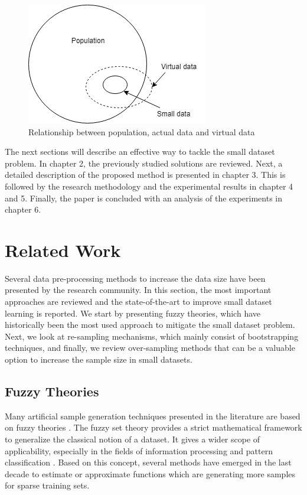 \documentclass[parskip=full]{scrartcl}
\begin{document}
\begin{figure}[H]
	\centering
	\includegraphics[width=0.35\linewidth]{./resources/relationship}
	\caption{Relationship between population, actual data and virtual data \cite{Li.2006}}
	\label{fig:relationship}
\end{figure}

The next sections will describe an effective way to tackle the small dataset 
problem. In chapter 2, the previously studied solutions are reviewed. Next, a 
detailed description of the proposed method is presented in chapter 3. This is 
followed by the research methodology and the experimental results in chapter 4 
and 5. Finally, the paper is concluded with an analysis of the experiments in 
chapter 6.

\section{Related Work}

Several data pre-processing methods to increase the data size have been presented by the research 
community. In this section, the most important approaches are reviewed and the state-of-the-art to 
improve small dataset learning is reported. We start by presenting fuzzy theories, which have 
historically been the most used approach to mitigate the small dataset problem.  Next, we look at 
re-sampling mechanisms, which mainly consist of bootstrapping techniques, and finally, we review 
over-sampling methods that can be a valuable option to increase the sample size in small datasets.

\subsection{Fuzzy Theories}

Many artificial sample generation techniques presented in the literature are based on fuzzy theories
\cite{AbdulLateh.2017}. The fuzzy set theory provides a strict mathematical framework to generalize the 
classical notion of a dataset. It gives a wider scope of applicability, especially in the fields of information 
processing and pattern classification \cite{Zimmermann.2010}. Based on this concept, several methods 
have emerged in the last decade to estimate or approximate functions which are generating more 
samples for sparse training sets.
\end{document}
